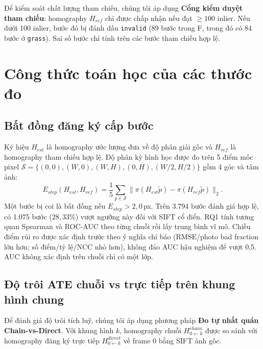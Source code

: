 \documentclass[conference]{IEEEtran}
\begin{document}
Để kiểm soát chất lượng tham chiếu, chúng tôi áp dụng \textbf{Cổng kiểm duyệt tham chiếu}: homography $H_{ref}$ chỉ được chấp nhận nếu đạt $\ge 100$ inlier. Nếu dưới 100 inlier, bước đó bị đánh dấu \texttt{invalid} ($89$ bước trong F, trong đó có 84 bước ở \texttt{grass}). Sai số bước chỉ tính trên các bước tham chiếu hợp lệ.

\section{Công thức toán học của các thước đo}
\label{sec:metrics}

\subsection{Bất đồng đăng ký cấp bước}
\label{subsec:metric_step_error}

Ký hiệu $H_{est}$ là homography ước lượng đưa về độ phân giải gốc và $H_{ref}$ là homography tham chiếu hợp lệ. Độ phân kỳ hình học được đo trên 5 điểm mốc pixel $\mathcal{S} = \{ (0, 0), (W, 0), (W, H), (0, H), (W/2, H/2) \}$ gồm 4 góc và tâm ảnh:
\begin{equation}
E_{step}(H_{est}, H_{ref}) = \frac{1}{5} \sum_{p \in \mathcal{S}} \| \pi(H_{est} \tilde{p}) - \pi(H_{ref} \tilde{p}) \|_2.
\label{eq:step_error_vi}
\end{equation}
Một bước bị coi là bất đồng nếu $E_{step} > 2{,}0$\,px. Trên 3.794 bước đánh giá hợp lệ, có 1.075 bước ($28{,}33\%$) vượt ngưỡng này đối với SIFT cổ điển.
RQ1 tính tương quan Spearman và ROC-AUC theo từng chuỗi rồi lấy trung bình vĩ mô. Chiều điểm rủi ro được xác định trước theo ý nghĩa chỉ báo (RMSE/photo bad fraction lớn hơn; số điểm/tỷ lệ/NCC nhỏ hơn), không đảo AUC hậu nghiệm để vượt 0,5. AUC không xác định trên chuỗi chỉ có một lớp.

\subsection{Độ trôi ATE chuỗi vs trực tiếp trên khung hình chung}
\label{subsec:metric_ate}

Để đánh giá độ trôi tích luỹ, chúng tôi áp dụng phương pháp \textbf{Đo tự nhất quán Chain-vs-Direct}. Với khung hình $k$, homography chuỗi $H_{0 \leftarrow k}^{chain}$ được so sánh với homography đăng ký trực tiếp $H_{0 \leftarrow k}^{direct}$ về frame 0 bằng SIFT ảnh gốc.
\end{document}

